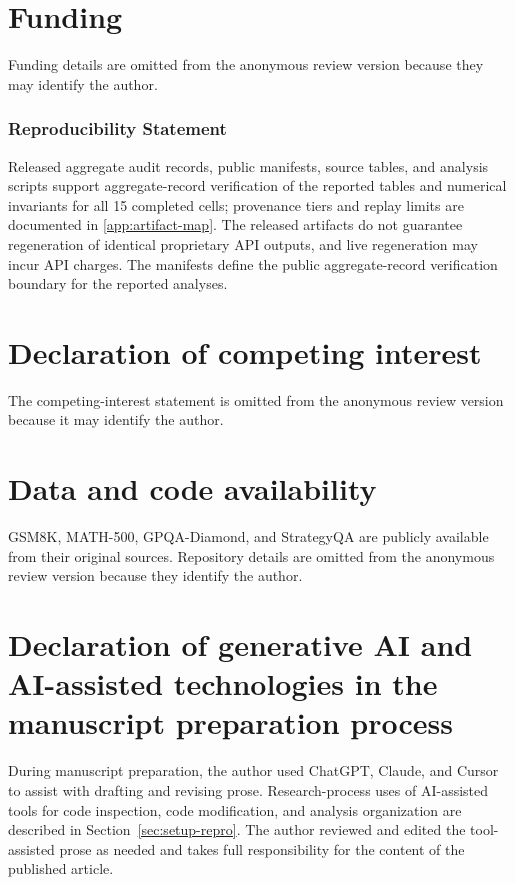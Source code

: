 \documentclass[preprint,12pt]{elsarticle}
\begin{document}
\section*{Funding}
Funding details are omitted from the anonymous review version because they may identify the author.

\subsubsection*{Reproducibility Statement}
Released aggregate audit records, public manifests, source tables, and analysis scripts support
aggregate-record verification of the reported tables and numerical invariants for all 15 completed
cells; provenance tiers and replay limits are documented in \ref{app:artifact-map}. The released
artifacts do not guarantee regeneration of identical proprietary API outputs, and live regeneration
may incur API charges. The manifests define the public aggregate-record verification boundary for
the reported analyses.

\section*{Declaration of competing interest}
The competing-interest statement is omitted from the anonymous review version because it may
identify the author.

\section*{Data and code availability}
GSM8K, MATH-500, GPQA-Diamond, and StrategyQA are publicly available from their original sources.
Repository details are omitted from the anonymous review version because they identify the author.

\section*{Declaration of generative AI and AI-assisted technologies in the manuscript preparation process}
During manuscript preparation, the author used ChatGPT, Claude, and Cursor to assist with drafting
and revising prose. Research-process uses of AI-assisted tools for code inspection, code
modification, and analysis organization are described in Section~\ref{sec:setup-repro}. The author
reviewed and edited the tool-assisted prose as needed and takes full responsibility for the content
of the published article.




\newpage
\appendix

\end{document}
